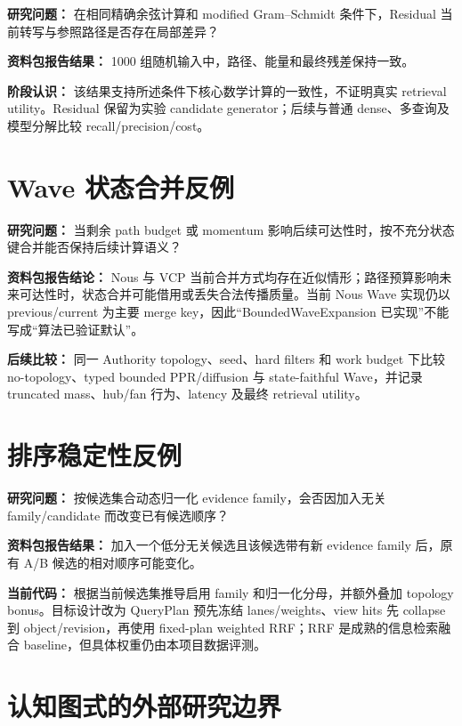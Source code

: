 \textbf{研究问题：} 在相同精确余弦计算和 modified Gram--Schmidt 条件下，Residual 当前转写与参照路径是否存在局部差异？

\textbf{资料包报告结果：} 1000 组随机输入中，路径、能量和最终残差保持一致。

\textbf{阶段认识：} 该结果支持所述条件下核心数学计算的一致性，不证明真实 retrieval utility。Residual 保留为实验 candidate generator；后续与普通 dense、多查询及模型分解比较 recall/precision/cost。

\section{Wave 状态合并反例}

\textbf{研究问题：} 当剩余 path budget 或 momentum 影响后续可达性时，按不充分状态键合并能否保持后续计算语义？

\textbf{资料包报告结论：} Nous 与 VCP 当前合并方式均存在近似情形；路径预算影响未来可达性时，状态合并可能借用或丢失合法传播质量。当前 Nous Wave 实现仍以 previous/current 为主要 merge key，因此“BoundedWaveExpansion 已实现”不能写成“算法已验证默认”。\cite{nous-research-package,nous-code-snapshot,vcptoolbox-commit}

\textbf{后续比较：} 同一 Authority topology、seed、hard filters 和 work budget 下比较 no-topology、typed bounded PPR/diffusion 与 state-faithful Wave，并记录 truncated mass、hub/fan 行为、latency 及最终 retrieval utility。

\section{排序稳定性反例}

\textbf{研究问题：} 按候选集合动态归一化 evidence family，会否因加入无关 family/candidate 而改变已有候选顺序？

\textbf{资料包报告结果：} 加入一个低分无关候选且该候选带有新 evidence family 后，原有 A/B 候选的相对顺序可能变化。

\textbf{当前代码：}  根据当前候选集推导启用 family 和归一化分母，并额外叠加 topology bonus。目标设计改为 QueryPlan 预先冻结 lanes/weights、view hits 先 collapse 到 object/revision，再使用 fixed-plan weighted RRF；RRF 是成熟的信息检索融合 baseline，但具体权重仍由本项目数据评测。\cite{nous-research-package,nous-code-snapshot,cormack2009rrf}

\section{认知图式的外部研究边界}

